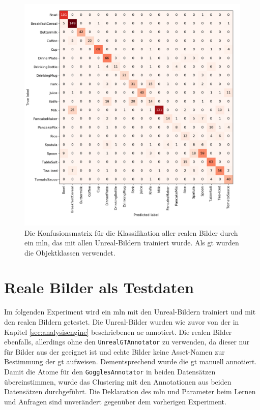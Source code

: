 \begin{figure}
\centering
	\includegraphics[scale=.315]{img/chapter6/UnrealRealGTCLass.png}
\caption[Konfusionsmatrix der Objektklassen Klassifikation mit Unreal-Trainingsset und realem Testset]{Die Konfusionsmatrix für die Klassifikation aller realen Bilder durch ein \gls{mln}, das mit allen Unreal-Bildern trainiert wurde. Als \gls{gt} wurden die Objektklassen verwendet.}
\label{fig:UnrealRealGTClass_confMatrix}
\end{figure}  

\section{Reale Bilder als Testdaten}

Im folgenden Experiment wird ein \gls{mln} mit den Unreal-Bildern trainiert und mit den realen Bildern getestet. Die Unreal-Bilder wurden wie zuvor von der in Kapitel \ref{sec:analysisengine} beschriebenen \gls{ae} annotiert. Die realen Bilder ebenfalls, allerdings ohne den \texttt{UnrealGTAnnotator} zu verwenden, da dieser nur für Bilder aus der \unreal geeignet ist und echte Bilder keine Asset-Namen zur Bestimmung der \gls{gt} aufweisen. Dementsprechend wurde die \gls{gt} manuell annotiert. Damit die Atome für den \texttt{GogglesAnnotator} in beiden Datensätzen übereinstimmen, wurde das Clustering mit den Annotationen aus beiden Datensätzen durchgeführt. Die Deklaration des \gls{mln} und Parameter beim Lernen und Anfragen sind unverändert gegenüber dem vorherigen Experiment. \par

